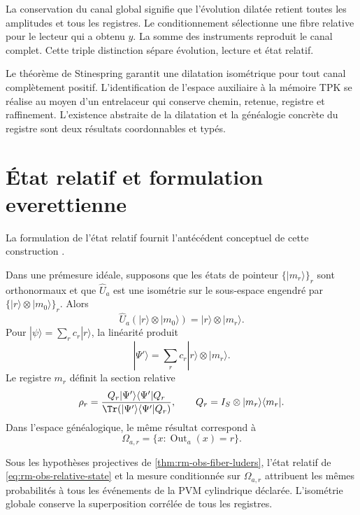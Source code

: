 La conservation du canal global signifie que l'évolution dilatée
retient toutes les amplitudes et tous les registres. Le conditionnement
sélectionne une fibre relative pour le lecteur qui a obtenu \(y\). La somme
des instruments reproduit le canal complet. Cette triple distinction
sépare évolution, lecture et état relatif.

Le théorème de Stinespring \cite{Stinespring1955} garantit une dilatation isométrique pour tout
canal complètement positif. L'identification de l'espace auxiliaire à
la mémoire TPK se réalise au moyen d'un entrelaceur qui conserve chemin,
retenue, registre et raffinement. L'existence abstraite de la dilatation
et la généalogie concrète du registre sont deux résultats coordonnables et
typés.

\section{État relatif et formulation everettienne}

La formulation de l'état relatif fournit l'antécédent conceptuel
de cette construction \cite{Everett1957}.

Dans une prémesure idéale, supposons que les états de pointeur
\(\{|m_r\rangle\}_r\) sont orthonormaux et que \(\widehat U_a\) est une
isométrie sur le sous-espace engendré par
\(\{|r\rangle\otimes|m_0\rangle\}_r\). Alors
\begin{equation}
 \widehat U_a(|r\rangle\otimes|m_0\rangle)
 =|r\rangle\otimes|m_r\rangle.
 \label{eq:rm-obs-ideal-premeasurement}
\end{equation}
Pour \(|\psi\rangle=\sum_r c_r|r\rangle\), la linéarité produit
\begin{equation}
 |\Psi'\rangle
 =\sum_r c_r|r\rangle\otimes|m_r\rangle.
 \label{eq:rm-obs-entangled-record}
\end{equation}
Le registre \(m_r\) définit la section relative
\begin{equation}
 \rho_r
 =\frac{Q_r|\Psi'\rangle\langle\Psi'|Q_r}
 {\Tr(|\Psi'\rangle\langle\Psi'|Q_r)},
 \qquad
 Q_r=I_S\otimes|m_r\rangle\langle m_r|.
 \label{eq:rm-obs-relative-state}
\end{equation}
Dans l'espace généalogique, le même résultat correspond à
\begin{equation}
 \Omega_{a,r}
 =\{x:\operatorname{Out}_a(x)=r\}.
 \label{eq:rm-obs-relative-fiber}
\end{equation}

\begin{theorem}
\label{thm:rm-obs-everett-correspondence}
Sous les hypothèses projectives de
\cref{thm:rm-obs-fiber-luders}, l'état relatif de
\cref{eq:rm-obs-relative-state} et la mesure conditionnée sur
\(\Omega_{a,r}\) attribuent les mêmes probabilités à tous les événements de
la PVM cylindrique déclarée. L'isométrie globale conserve la superposition
corrélée de tous les registres.
\end{theorem}

